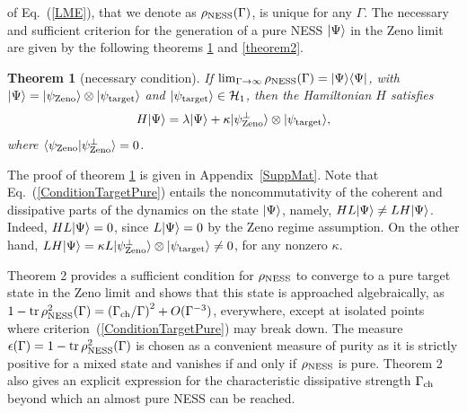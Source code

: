 \documentclass[aps,pra,letterpaper,twocolumn,showpacs,superscriptaddress,floatfix,longbibliography]{revtex4-1}
\newcommand{\tr}{\mathop{\mathrm{tr}}\limits}
\newtheorem{theorem}{Theorem} \newtheorem{lemma}{lemma}
\begin{document}
of Eq.~(\ref{LME}), that we denote as $\rho_{\rm{NESS}}(\Gamma)$, is
unique for any $\Gamma$.  The necessary and sufficient criterion for
the generation of a pure NESS $|{\Psi}\rangle$ in the Zeno limit are given
by the following theorems \ref{theorem1} and \ref{theorem2}.
\begin{theorem}[necessary condition]
  \label{theorem1}
  If $\lim_{\Gamma\to\infty} \rho_{\rm{NESS}}(\Gamma) =
  |{\Psi}\rangle\langle{\Psi}|$, with $|{\Psi }\rangle = |{\psi_{\rm{Zeno}}}\rangle
  \otimes |{\psi_{\rm{target}}}\rangle$ and
  $|{\psi_{\rm{target}}}\rangle\in\mathcal{H}_1$, then the Hamiltonian $H$
  satisfies
  \begin{align}
    H |{\Psi}\rangle = \lambda |{\Psi}\rangle + \kappa
    |{\psi_{\rm{Zeno}}^\perp}\rangle \otimes |{\psi_{\rm{target}}}\rangle,
    \label{ConditionTargetPure}
  \end{align}
  where $\langle\psi_{\rm{Zeno}}|\psi_{\rm{Zeno}}^\perp\rangle=0$.
\end{theorem}
The proof of theorem \ref{theorem1} is given in
Appendix~\ref{SuppMat}.  Note that Eq.~(\ref{ConditionTargetPure})
entails the noncommutativity of the coherent and dissipative parts of
the dynamics on the state $|{\Psi}\rangle$, namely, $H L|{\Psi}\rangle \neq L
H|{\Psi}\rangle$.  Indeed, $H L|{\Psi}\rangle=0$, since $L|{\Psi}\rangle=0$ by the
Zeno regime assumption.  On the other hand, $ L H|{\Psi}\rangle=\kappa L
|{\psi_{\rm{Zeno}}^\perp}\rangle \otimes |{\psi_{\rm{target}}}\rangle \neq 0$,
for any nonzero $\kappa$.

Theorem 2 provides a sufficient condition for $\rho_{\rm{NESS}}$ to
converge to a pure target state in the Zeno limit and shows that this
state is approached algebraically, as $ 1-
\tr\rho_{\rm{NESS}}^2(\Gamma) = \left( \Gamma_{\rm{ch}}/\Gamma
\right)^2+ O(\Gamma^{-3}) $, everywhere, except at isolated points
where criterion~(\ref{ConditionTargetPure}) may break down.  The
measure $\epsilon(\Gamma) = 1- \tr\rho_{\rm{NESS}}^2(\Gamma)$ is
chosen as a convenient measure of purity as it is strictly positive
for a mixed state and vanishes if and only if $\rho_{\rm{NESS}}$ is
pure. Theorem 2 also gives an explicit expression for the
characteristic dissipative strength $\Gamma_{\rm{ch}}$ beyond which an
almost pure NESS can be reached.
\end{document}
